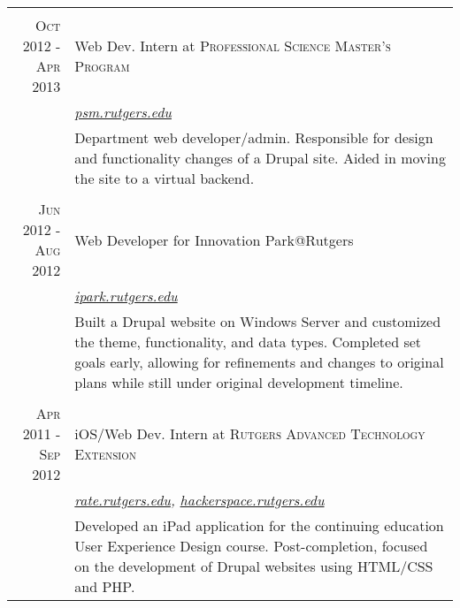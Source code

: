\documentclass[a4paper, 10pt, onepage]{article} %
\begin{document}
\begin{tabular}{r|p{10cm}}
\multicolumn{2}{c}{}\\
\textsc{Oct 2012 - Apr 2013} & Web Dev. Intern at \textsc{Professional Science Master's Program}\\
& \small\emph{\href{https://psm.rutgers.edu}{psm.rutgers.edu}}\\
& \footnotesize{Department web developer/admin. Responsible for design and functionality changes of a Drupal site. Aided in moving the site to a virtual backend.}\\

\multicolumn{2}{c}{}\\
\textsc{Jun 2012 - Aug 2012} & Web Developer for Innovation Park@Rutgers\\
& \small\emph{\href{https://ipark.rutgers.edu}{ipark.rutgers.edu}}\\
& \footnotesize{Built a Drupal website on Windows Server and customized the theme, functionality, and data types. Completed set goals early, allowing for refinements and changes to original plans while still under original development timeline.}\\

\multicolumn{2}{c}{}\\
\textsc{Apr 2011 - Sep 2012} & iOS/Web Dev. Intern at \textsc{Rutgers Advanced Technology Extension}\\
& \small\emph{\href{https://rate.rutgers.edu}{rate.rutgers.edu}, \href{https://hackerspace.rutgers.edu}{hackerspace.rutgers.edu}}\\
& \footnotesize{Developed an iPad application for the continuing education User Experience Design course. Post-completion, focused on the development of Drupal websites using HTML/CSS and PHP.}
\end{tabular}
\end{document}
